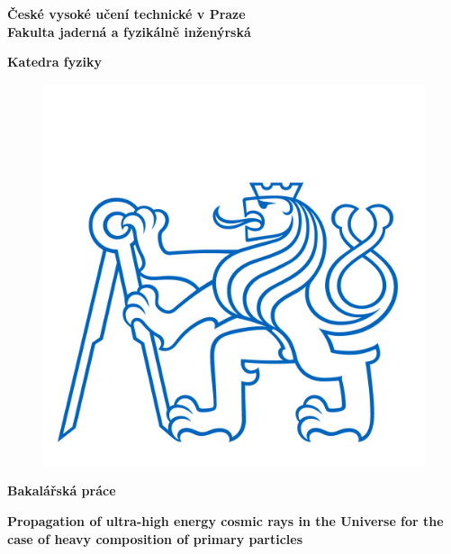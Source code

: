\documentclass[a4paper,12pt]{report}
\newcommand{\cvut}{České vysoké učení technické v Praze }
\newcommand{\fjfi}{Fakulta jaderná a fyzikálně inženýrská}
\newcommand{\kdaiz}{Katedra fyziky}
\newcommand{\nazeven}{Propagation of ultra-high energy cosmic rays in the Universe for the case of heavy composition of primary particles}
\newcommand{\nazevcz}{}
\begin{document}
	
\thispagestyle{empty}
\begin{center}
  {\Large \bf \cvut\\[2mm] \fjfi\\ }
  \vspace{3mm}
  
  {\large \bf \kdaiz}\\
   \vspace{2mm} 
  
  \vspace{0mm}

\begin{figure}[h]
\begin{center}
	\includegraphics[scale=1.5]{cvut.jpg}
\end{center}
\end{figure}

  \vspace{5mm}


  \vspace{0mm}
  {\Huge\textbf{Bakalářská práce}}

  \vspace{15mm}
  {\Large \textbf{\nazevcz}} \par 
  \vspace{15mm}
  {\Large \textbf{\nazeven}}
  
\end{center}
\end{document}
